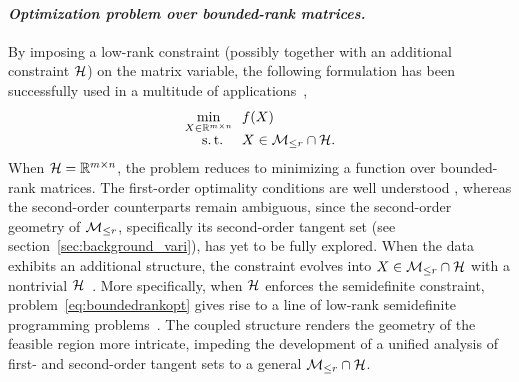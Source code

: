 \paragraph{\emph{\textbf{Optimization problem over bounded-rank matrices.}}} By imposing a low-rank constraint (possibly together with an additional constraint $\mathcal{H}$) on the matrix variable, the following formulation has been successfully used in a multitude of applications~\cite{markovsky2008systemide,zhu2022learningmarkov},
\begin{equation}\label{eq:boundedrankopt}
\begin{aligned}
    \min_{X\in\mathbb{R}^{m\times n}}\ \ & f(X)\\[-1.5mm]
    \mathrm{s.\,t.}\ \ \ \ & X\in\mathcal{M}_{\le r}\cap\mathcal{H}.
    \end{aligned}
\end{equation}
When $\mathcal{H}=\mathbb{R}^{m\times n}$, the problem reduces to minimizing a function over bounded-rank matrices. The first-order optimality conditions are well understood \cite{cason2013iterative,hosseini2019MordukhovichClarke,levin2023remedy}, whereas the second-order counterparts remain ambiguous, since the second-order geometry of $\mathcal{M}_{\le r}$, specifically its second-order tangent set (see section~\ref{sec:background_vari}), has yet to be fully explored. When the data exhibits an additional structure, the constraint evolves into $X\in\mathcal{M}_{\le r}\cap\mathcal{H}$ with a nontrivial $\mathcal{H}$~\cite{cason2013iterative,tam2017sparsesdp,li2020jotaspectral,li2023normalboundedaffine,yang2025spacedecouple}. More specifically, when $\mathcal{H}$ enforces the semidefinite constraint, problem~\eqref{eq:boundedrankopt} gives rise to a line of low-rank semidefinite programming problems~\cite{boumal2016BMSDP,wang2023decomposition,tang2024feasibleSDP,levin2025effect}. The coupled structure renders the geometry of the feasible region more intricate, impeding the development of a unified analysis of first- and second-order tangent sets to a general $\mathcal{M}_{\le r} \cap \mathcal{H}$.

